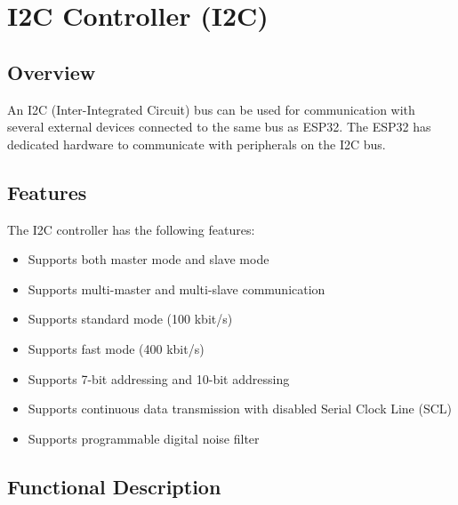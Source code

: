 \documentclass[main\_\_EN.tex]{subfiles}
\begin{document}
\setenglishformatting

\ifglobal
\else
    \listoftodos
    {\let\clearpage\relax \listofdonetodos}
    \tableofcontents
\fi



\hypertarget{i2c}{}
\chapter{I2C Controller (I2C)}
\label{mod:i2c}


\section{Overview}

An I2C (Inter-Integrated Circuit) bus can be used for communication with several external devices connected to the same bus as ESP32. The ESP32 has dedicated hardware to communicate with peripherals on the I2C bus.

\section{Features}

The I2C controller has the following features:

\begin{itemize}
    \item Supports both master mode and slave mode
    \item Supports multi-master and multi-slave communication
    \item Supports standard mode (100 kbit/s)
    \item Supports fast mode (400 kbit/s)
    \item Supports 7-bit addressing and 10-bit addressing
    \item Supports continuous data transmission with disabled Serial Clock Line (SCL)
    \item Supports programmable digital noise filter
\end{itemize}

\section{Functional Description}
\end{document}

